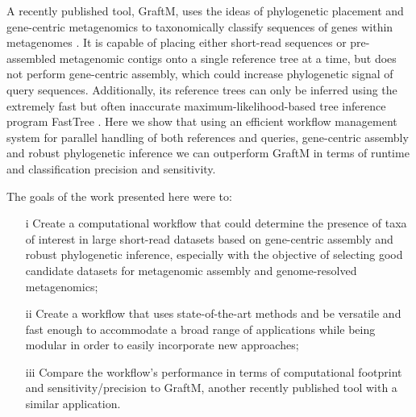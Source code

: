 \documentclass{bioinfo}
\begin{document}
A recently published tool, GraftM, uses the ideas of phylogenetic placement and gene-centric metagenomics to taxonomically classify sequences of genes within metagenomes \citep{Boyd2018}. It is capable of placing either short-read sequences or pre-assembled metagenomic contigs onto a single reference tree at a time, but does not perform gene-centric assembly, which could increase phylogenetic signal of query sequences. Additionally, its reference trees can only be inferred using the extremely fast but often inaccurate maximum-likelihood-based tree inference program FastTree \citep{Price2010,Zhou2018}. Here we show that using an efficient workflow management system for parallel handling of both references and queries, gene-centric assembly and robust phylogenetic inference we can outperform GraftM in terms of runtime and classification precision and sensitivity. 

The goals of the work presented here were to: 
\begin{enumerate}
\item[i] Create a computational workflow that could determine the presence of taxa of interest in large short-read datasets based on gene-centric assembly and robust phylogenetic inference, especially with the objective of selecting good candidate datasets for metagenomic assembly and genome-resolved metagenomics;
\item[ii] Create a workflow that uses state-of-the-art methods and be versatile and fast enough to accommodate a broad range of applications while being modular in order to easily incorporate new approaches;
\item[iii] Compare the workflow’s performance in terms of computational footprint and sensitivity/precision to GraftM, another recently published tool with a similar application.
\end{enumerate}
\end{document}
